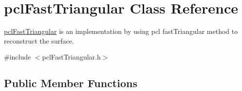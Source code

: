 \hypertarget{classpclFastTriangular}{}\section{pcl\+Fast\+Triangular Class Reference}
\label{classpclFastTriangular}


\hyperlink{classpclFastTriangular}{pcl\+Fast\+Triangular} is an implementation by using pcl fast\+Triangular method to reconstruct the surface.
\begin{DoxyItemize}
\item 
\end{DoxyItemize} 




{\ttfamily \#include $<$pcl\+Fast\+Triangular.\+h$>$}

\subsection*{Public Member Functions}
